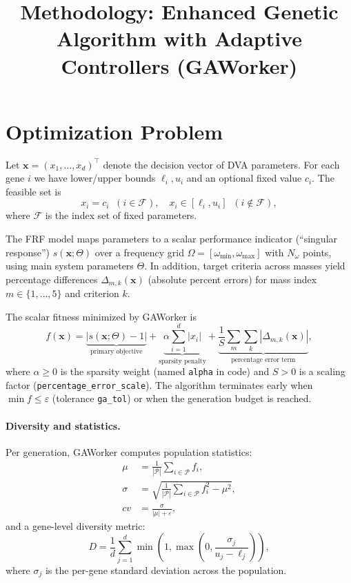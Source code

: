 \documentclass[12pt,a4paper]{article}
\title{Methodology: Enhanced Genetic Algorithm with Adaptive Controllers (GAWorker)}
\date{}
\begin{document}
\maketitle

\section{Optimization Problem}
Let $\bm{x} = (x_1,\ldots,x_d)^\top$ denote the decision vector of DVA parameters. For each gene $i$ we have lower/upper bounds $\ell_i, u_i$ and an optional fixed value $c_i$. The feasible set is
\[ x_i = c_i \;\; (i \in \mathcal{F}) , \quad x_i \in [\ell_i,u_i] \;\; (i \notin \mathcal{F}) , \]
where $\mathcal{F}$ is the index set of fixed parameters.

The FRF model maps parameters to a scalar performance indicator (``singular response'') $s(\bm{x};\Theta)$ over a frequency grid $\Omega=[\omega_{\min},\omega_{\max}]$ with $N_\omega$ points, using main system parameters $\Theta$. In addition, target criteria across masses yield percentage differences $\Delta_{m,k}(\bm{x})$ (absolute percent errors) for mass index $m\in\{1,\ldots,5\}$ and criterion $k$.

The scalar fitness minimized by GAWorker is
\begin{equation}
\label{eq:fitness}
f(\bm{x}) = \underbrace{\left| s(\bm{x};\Theta) - 1\right|}_{\text{primary objective}} + \underbrace{\alpha \sum_{i=1}^{d} |x_i|}_{\text{sparsity penalty}} + \underbrace{\frac{1}{S} \sum_{m} \sum_{k} |\Delta_{m,k}(\bm{x})|}_{\text{percentage error term}},
\end{equation}
where $\alpha\ge 0$ is the sparsity weight (named \texttt{alpha} in code) and $S>0$ is a scaling factor (\texttt{percentage\_error\_scale}). The algorithm terminates early when $\min f \le \varepsilon$ (tolerance \texttt{ga\_tol}) or when the generation budget is reached.

\paragraph{Diversity and statistics.} Per generation, GAWorker computes population statistics:
\begin{align}
\mu &= \frac{1}{|\mathcal{P}|} \sum_{i\in \mathcal{P}} f_i, \label{eq:mean_fitness} \\
\sigma &= \sqrt{\frac{1}{|\mathcal{P}|} \sum_{i\in \mathcal{P}} f_i^2 - \mu^2}, \label{eq:std_fitness} \\
cv &= \frac{\sigma}{|\mu|+\varepsilon}, \label{eq:coefficient_variation}
\end{align}
and a gene-level diversity metric:
\begin{equation}
D = \frac{1}{d} \sum_{j=1}^{d} \min\!\left(1,\max\!\left(0, \frac{\sigma_j}{u_j-\ell_j}\right)\right), \label{eq:gene_diversity}
\end{equation}
where $\sigma_j$ is the per-gene standard deviation across the population.
\end{document}

